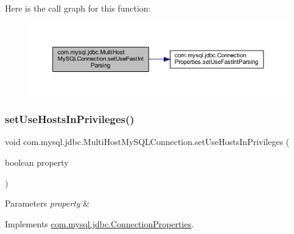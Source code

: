 Here is the call graph for this function\+:
\nopagebreak
\begin{figure}[H]
\begin{center}
\leavevmode
\includegraphics[width=350pt]{classcom_1_1mysql_1_1jdbc_1_1_multi_host_my_s_q_l_connection_a98e6251a2f619959c059daff4a1411a7_cgraph}
\end{center}
\end{figure}
\mbox{\label{classcom_1_1mysql_1_1jdbc_1_1_multi_host_my_s_q_l_connection_a4e5dd7ecb303ca181e108a90b5917445}} 
\subsubsection{\texorpdfstring{set\+Use\+Hosts\+In\+Privileges()}{setUseHostsInPrivileges()}}
{\footnotesize\ttfamily void com.\+mysql.\+jdbc.\+Multi\+Host\+My\+S\+Q\+L\+Connection.\+set\+Use\+Hosts\+In\+Privileges (\begin{DoxyParamCaption}\item[{boolean}]{property }\end{DoxyParamCaption})}


\begin{DoxyParams}{Parameters}
{\em property} & \\
\hline
\end{DoxyParams}


Implements \mbox{\hyperlink{interfacecom_1_1mysql_1_1jdbc_1_1_connection_properties_aefb08a45df4754d8d6c96b06d36991b5}{com.\+mysql.\+jdbc.\+Connection\+Properties}}.


